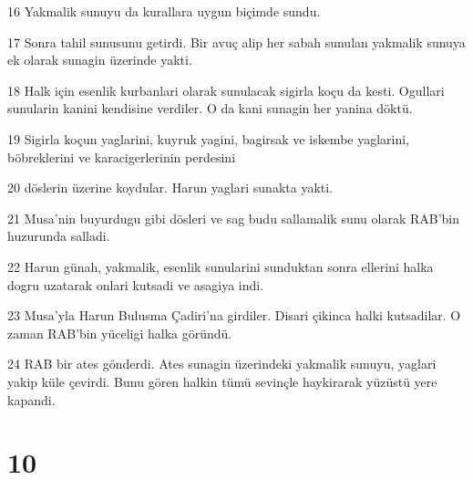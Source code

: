 \par 16 Yakmalik sunuyu da kurallara uygun biçimde sundu.
\par 17 Sonra tahil sunusunu getirdi. Bir avuç alip her sabah sunulan yakmalik sunuya ek olarak sunagin üzerinde yakti.
\par 18 Halk için esenlik kurbanlari olarak sunulacak sigirla koçu da kesti. Ogullari sunularin kanini kendisine verdiler. O da kani sunagin her yanina döktü.
\par 19 Sigirla koçun yaglarini, kuyruk yagini, bagirsak ve iskembe yaglarini, böbreklerini ve karacigerlerinin perdesini
\par 20 döslerin üzerine koydular. Harun yaglari sunakta yakti.
\par 21 Musa'nin buyurdugu gibi dösleri ve sag budu sallamalik sunu olarak RAB'bin huzurunda salladi.
\par 22 Harun günah, yakmalik, esenlik sunularini sunduktan sonra ellerini halka dogru uzatarak onlari kutsadi ve asagiya indi.
\par 23 Musa'yla Harun Bulusma Çadiri'na girdiler. Disari çikinca halki kutsadilar. O zaman RAB'bin yüceligi halka göründü.
\par 24 RAB bir ates gönderdi. Ates sunagin üzerindeki yakmalik sunuyu, yaglari yakip küle çevirdi. Bunu gören halkin tümü sevinçle haykirarak yüzüstü yere kapandi.

\chapter{10}

